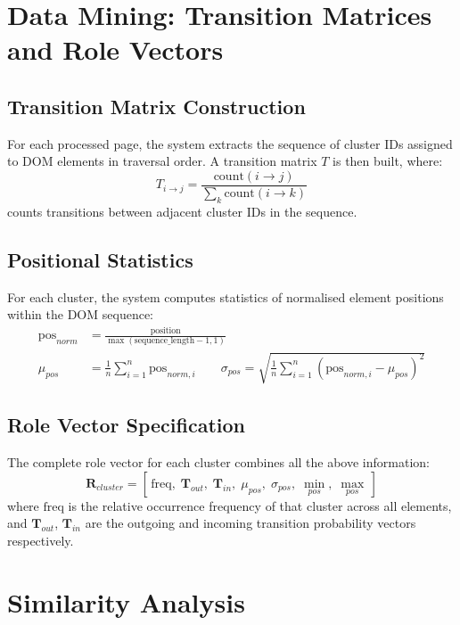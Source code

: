 \section{Data Mining: Transition Matrices and Role Vectors}
\label{sec:data-mining}

\subsection{Transition Matrix Construction}

For each processed page, the system extracts the sequence of cluster IDs assigned to DOM elements in traversal order. A transition matrix $T$ is then built, where:
\begin{equation}
T_{i \rightarrow j} = \frac{\text{count}(i \rightarrow j)}{\sum_{k} \text{count}(i \rightarrow k)}
\end{equation}
counts transitions between adjacent cluster IDs in the sequence.

\subsection{Positional Statistics}

For each cluster, the system computes statistics of normalised element positions within the DOM sequence:
\begin{align}
\text{pos}_{norm} &= \frac{\text{position}}{\max(\text{sequence\_length} - 1, 1)} \\
\mu_{pos} &= \frac{1}{n}\sum_{i=1}^{n}\text{pos}_{norm,i} \qquad
\sigma_{pos} = \sqrt{\frac{1}{n}\sum_{i=1}^{n}(\text{pos}_{norm,i} - \mu_{pos})^2}
\end{align}

\subsection{Role Vector Specification}

The complete role vector for each cluster combines all the above information:
\begin{equation}
\mathbf{R}_{cluster} = [\,\text{freq},\; \mathbf{T}_{out},\; \mathbf{T}_{in},\; \mu_{pos},\; \sigma_{pos},\; \min_{pos},\; \max_{pos}\,]
\end{equation}
where $\text{freq}$ is the relative occurrence frequency of that cluster across all elements, and $\mathbf{T}_{out}$, $\mathbf{T}_{in}$ are the outgoing and incoming transition probability vectors respectively.

\section{Similarity Analysis}
\label{sec:similarity-analysis}

